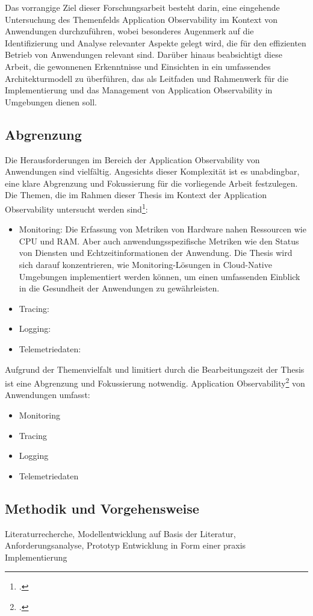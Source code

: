 Das vorrangige Ziel dieser Forschungsarbeit besteht darin, eine eingehende Untersuchung des Themenfelds Application Observability im Kontext von \cn Anwendungen durchzuführen, wobei besonderes Augenmerk auf die Identifizierung und Analyse relevanter Aspekte gelegt wird, die für den effizienten Betrieb von Anwendungen relevant sind. Darüber hinaus beabsichtigt diese Arbeit, die gewonnenen Erkenntnisse und Einsichten in ein umfassendes Architekturmodell zu überführen, das als Leitfaden und Rahmenwerk für die Implementierung und das Management von Application Observability in \cn Umgebungen dienen soll.

\subsection{Abgrenzung}
Die Herausforderungen im Bereich der Application Observability von \cn Anwendungen sind vielfältig. Angesichts dieser Komplexität ist es unabdingbar, eine klare Abgrenzung und Fokussierung für die vorliegende Arbeit festzulegen. Die Themen, die im Rahmen dieser Thesis im Kontext der Application Observability untersucht werden sind\footcite[Vgl.][S.5]{Pourmajidi2023}:
\begin{itemize}
	\item Monitoring: Die Erfassung von Metriken von Hardware nahen Ressourcen wie CPU und RAM. Aber auch anwendungsspezifische Metriken wie den Status von Diensten und Echtzeitinformationen der Anwendung. Die Thesis wird sich darauf konzentrieren, wie Monitoring-Lösungen in Cloud-Native Umgebungen implementiert werden können, um einen umfassenden Einblick in die Gesundheit der Anwendungen zu gewährleisten.
	\item Tracing:
	\item Logging:
	\item Telemetriedaten:
\end{itemize}

Aufgrund der Themenvielfalt und limitiert durch die Bearbeitungszeit der Thesis ist eine Abgrenzung und Fokussierung notwendig. Application Observability\footcite[Vgl.][S.5]{Pourmajidi2023} von \cn Anwendungen umfasst:
\begin{itemize}
\item Monitoring
\item Tracing
\item Logging
\item Telemetriedaten
\end{itemize}


\subsection{Methodik und Vorgehensweise}
Literaturrecherche, Modellentwicklung auf Basis der Literatur, Anforderungsanalyse, Prototyp Entwicklung in Form einer praxis Implementierung